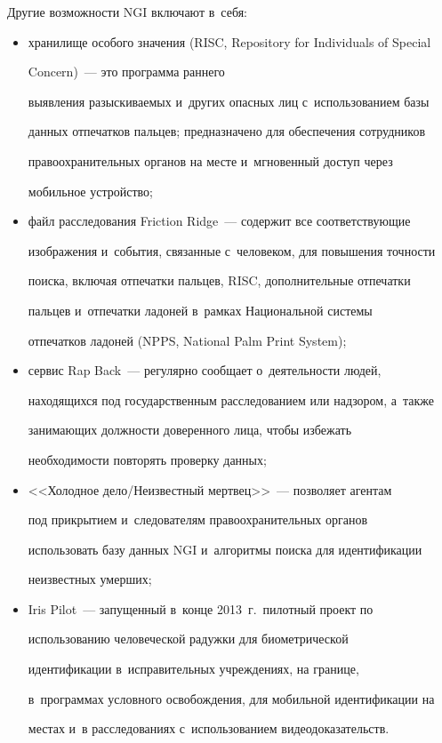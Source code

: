   Другие возможности NGI включают в~себя:


  \begin{itemize}


\item хранилище особого значения (RISC, Repository for Individuals of Special


Concern)~--- это программа раннего


выявления разыскиваемых и~других опасных лиц с~использованием базы


данных отпечатков пальцев; предназначено для обеспечения сотрудников


правоохранительных органов на месте и~мгновенный доступ через


мобильное устройство;


\item файл расследования Friction Ridge~--- содержит все соответствующие


изображения и~события, связанные с~человеком, для повышения точности


поиска, вклю\-чая отпечатки пальцев, RISC, дополнительные отпечатки


пальцев и~отпечатки ладоней в~рамках Национальной системы


отпечатков ладоней (NPPS, National Palm Print System);


\item сервис Rap Back~--- регулярно сообщает о~деятельности людей,


находящихся под государственным расследованием или надзором, а~также


занимающих должности доверенного лица, чтобы избежать


необходимости повторять проверку данных;


\item <<Холодное дело/Не\-из\-вест\-ный мертвец>>~--- позволяет агентам


под прикрытием и~следователям правоохранительных органов


использовать базу данных NGI и~алгоритмы поиска для идентификации


неизвестных умерших;


\item Iris Pilot~--- запущенный в~конце 2013~г.\ пилотный проект по


использованию человеческой радужки для биометрической


идентификации в~исправительных учреждениях, на границе,


в~программах условного освобождения, для мобильной идентификации на


местах и~в расследованиях с~использованием видеодоказательств.\\[-15pt]


  \end{itemize}


